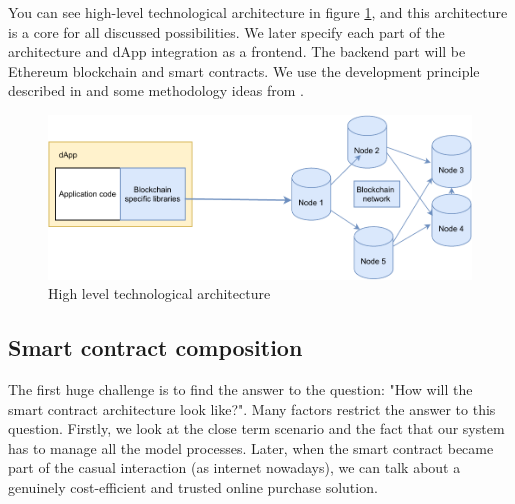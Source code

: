 \documentclass[thesis=M,english]{FITthesis}[2019/12/23]
\begin{document}
You can see high-level technological architecture in figure \ref{fig:highlevelArchitecture}, and this architecture is a core for all discussed possibilities. We later specify each part of the architecture and dApp integration as a frontend. The backend part will be Ethereum blockchain and smart contracts. We use the development principle described in \cite{agiledevmethod} and some methodology ideas from \cite{workers}.


\begin{figure}[ht!]
    \centering
    \includegraphics[width=\textwidth]{assets/highLevelArchitecture.pdf}
    \caption{High level technological architecture \cite{Singhal2018} }
    \label{fig:highlevelArchitecture}
\end{figure}



\subsection{Smart contract composition}



The first huge challenge is to find the answer to the question: "How will the smart contract architecture look like?". Many factors restrict the answer to this question. Firstly, we look at the close term scenario and the fact that our system has to manage all the model processes. Later, when the smart contract became part of the casual interaction (as internet nowadays), we can talk about a genuinely cost-efficient and trusted online purchase solution.
\end{document}
